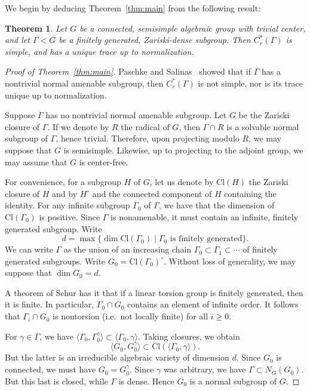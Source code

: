 \documentclass{amsart}
\theoremstyle{plain}
\newtheorem{theorem}{Theorem}[section]
\theoremstyle{definition}
\theoremstyle{remark}
\begin{document}
We begin by deducing Theorem~\ref{thm:main} from the following result:
\begin{theorem}\label{thm:subgroup}
Let $G$ be a connected, semisimple algebraic group with trivial center, and let $\Gamma <
G$ be a finitely generated,
Zariski-dense subgroup. Then $C_{r}^{*}(\Gamma)$ is simple, and has a unique trace up
to normalization.
\end{theorem}
\begin{proof}[Proof of Theorem~\ref{thm:main}]
Paschke and Salinas~\cite{MR82c:22010} showed that if $\Gamma$ has a nontrivial normal
amenable subgroup, then $C_{r}^{*}(\Gamma)$ is not simple, nor is its trace unique up to
normalization.

Suppose $\Gamma$ has no nontrivial normal
amenable subgroup. Let $G$ be the Zariski closure of $\Gamma$. If we denote by $R$
the radical of $G$, then $\Gamma \cap R$ is a solvable normal subgroup of $\Gamma$,
hence trivial. Therefore, upon projecting modulo $R$, we may suppose that $G$ is
semisimple. Likewise, up to projecting to the adjoint group, we may assume that $G$ is
center-free.

For convenience, for a subgroup $H$ of $G$, let us denote by $\mathrm{Cl}(H)$ the Zariski closure
of $H$ and by $H^{\circ}$ and the connected component of $H$ containing the identity.
For any infinite subgroup $\Gamma_{0}$ of $\Gamma$, we have that the dimension of $\mathrm{Cl}(\Gamma_{0})$ is
positive. Since $\Gamma$ is nonamenable, it must contain an infinite, finitely generated
subgroup. Write
$$d = \max\{\dim \mathrm{Cl}(\Gamma_{0}) \mid \Gamma_{0}\text{ is finitely generated}\}.$$
We can write $\Gamma$ as the union of an increasing chain $\Gamma_{0} \subset \Gamma_{1} \subset
\cdots$ of finitely generated
subgroups. Write $G_{0} = \mathrm{Cl}(\Gamma_{0})^{\circ}$. Without loss of generality, we
may suppose that $\dim G_{0} = d$.

A theorem of Schur has it that if a linear torsion group is finitely generated, then it is
finite. In particular, $\Gamma_{0} \cap G_{0}$ contains an element of infinite order. It
follows that $\Gamma_{i} \cap G_{0}$ is nontorsion (i.e.\ not locally finite) for all $i
\geqslant 0$.

For $\gamma \in \Gamma$, we have $\langle \Gamma_{0}, \Gamma_{0}^{\gamma} \rangle \subset
\langle \Gamma_{0},\gamma \rangle$. Taking closures, we obtain
$$\langle G_{0}, G_{0}^{\gamma} \rangle \subset
\mathrm{Cl}(\langle \Gamma_{0},\gamma \rangle).$$
But the latter is an irreducible algebraic variety of dimension $d$. Since $G_{0}$ is
connected, we must have $G_{0} = G_{0}^{\gamma}$. Since $\gamma$ was arbitrary, we have
$\Gamma \subset N_{G}(G_{0})$. But this last is closed, while $\Gamma$ is dense. Hence
$G_{0}$ is a normal subgroup of $G$.


\end{proof}
\end{document}
